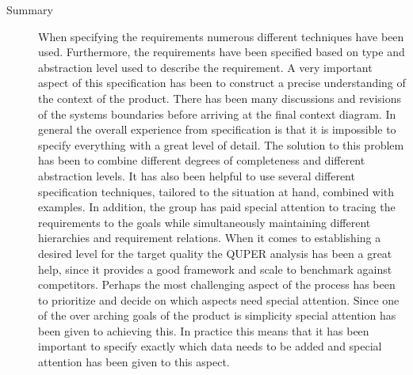 \documentclass[10pt,a4paper]{article}
\begin{document}
\begin{description}
\item[Summary] When specifying the requirements numerous different techniques have been used. Furthermore, the requirements have been specified based on type and abstraction level used to describe the requirement. A very important aspect of this specification has been to construct a precise understanding of the context of the product. There has been many discussions and revisions of the systems boundaries before arriving at the final context diagram. In general the overall experience from specification is that it is impossible to specify everything with a great level of detail. The solution to this problem has been to combine different degrees of completeness and different abstraction levels. It has also been helpful to use several different specification techniques, tailored to the situation at hand, combined with examples. In addition, the group has paid special attention to tracing the requirements to the goals while simultaneously maintaining different hierarchies and requirement relations. When it comes to establishing a desired level for the target quality the QUPER analysis has been a great help, since it provides a good framework and scale to benchmark against competitors. 
 Perhaps the most challenging aspect of the process has been to prioritize and decide on which aspects need special attention. Since one of the over arching goals of the product is simplicity special attention has been given to achieving this. In practice this means that it has been important to specify exactly which data needs to be added and special attention has been given to this aspect. 

\end{description}

\end{document}
